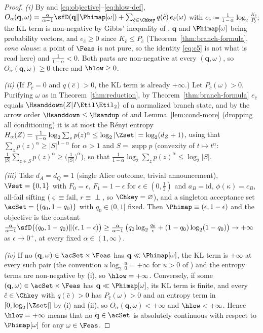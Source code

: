 \begin{proof}
\emph{(i)} By  and
\eqref{eq:objective}--\eqref{eq:hlow-def},
$O_{\alpha}(\mathbf q,\omega)
=\frac{\alpha}{\alpha-1}\sfD(\mathbf q\|\Phimap[\omega])
+\sum_{\hat c\in\Chkey}q(\hat c)\,e_{\hat c}(\omega)$ with
$e_{\hat c}\coloneqq\frac{1}{1-\alpha}\log_2\frac{K_{\hat c}}{P_{\hat c}}$;
the KL term is non-negative by Gibbs' inequality of
, $\mathbf q$ and $\Phimap[\omega]$ being
probability vectors, and $e_{\hat c}\ge0$ since
$K_{\hat c}\le P_{\hat c}$ (Theorem~\ref{thm:branch-formula}, \emph{cone
clause}: a point of $\Feas$ is not pure, so the identity \eqref{eq:c5} is not
what is read here) and $\frac{1}{1-\alpha}<0$. Both parts are non-negative at
every $(\mathbf q,\omega)$, so $O_{\alpha}(\mathbf q,\omega)\ge0$ there and
$\hlow\ge0$.

\emph{(ii)} (If $P_{\hat c}=0$ and $q(\hat c)>0$, the KL term is already
$+\infty$.) Let $P_{\hat c}(\omega)>0$. Purifying $\omega$ as in
Theorem~\ref{thm:reduction}, by Theorem~\ref{thm:branch-formula}
$e_{\hat c}$ equals $\Hsanddown(Z|I\Etil\Etil_2)$ of a normalized branch
state, and by the arrow order $\Hsanddown\le\Hsandup$ of
 and Lemma~\ref{lem:cond-more} (dropping all
conditioning) it is at most the R\'enyi entropy
$H_{\alpha}(Z)=\frac{1}{1-\alpha}\log_2\sum_zp(z)^{\alpha}
\le\log_2|\Zset|=\log_2(d_Z+1)$, using that
$\sum_zp(z)^{\alpha}\ge|S|^{1-\alpha}$ for $\alpha>1$ and
$S=\operatorname{supp}p$ (convexity of $t\mapsto t^{\alpha}$:
$\frac{1}{|S|}\sum_{z\in S}p(z)^{\alpha}
\ge\big(\frac{1}{|S|}\big)^{\alpha}$), so that
$\frac{1}{1-\alpha}\log_2\sum_zp(z)^{\alpha}\le\log_2|S|$.

\emph{(iii)} Take $d_A=d_Q=1$ (single Alice outcome, trivial
announcement), $\Vset=\{0,1\}$ with $F_0=\epsilon$, $F_1=1-\epsilon$ for
$\epsilon\in(0,\tfrac12)$ and $a_B=\mathrm{id}$, $\phi(\kappa)=c_B$,
all-fail sifting ($\varsigma\equiv\mathrm{fail}$, $r\equiv\perp$, so
$\Chkey=\varnothing$), and a singleton acceptance set
$\acSet=\{(q_0,1-q_0)\}$ with $q_0\in(0,1]$ fixed. Then
$\Phimap\equiv(\epsilon,1-\epsilon)$ and the objective is the constant
$\frac{\alpha}{\alpha-1}\sfD\big((q_0,1-q_0)\|(\epsilon,1-\epsilon)\big)
\ge\frac{\alpha}{\alpha-1}\,\big(q_0\log_2\frac{q_0}{\epsilon}
+(1-q_0)\log_2(1-q_0)\big)\to+\infty$ as $\epsilon\to0^{+}$, at every
fixed $\alpha\in(1,\infty)$.

\emph{(iv)} If no $(\mathbf q,\omega)\in\acSet\times\Feas$ has
$\mathbf q\ll\Phimap[\omega]$, the KL term is $+\infty$ at every such pair
(the convention $u\log_2\frac u0=+\infty$ for $u>0$ of
) and the entropy terms are non-negative by (i), so
$\hlow=+\infty$. Conversely, if some $(\mathbf q,\omega)\in\acSet\times\Feas$
has $\mathbf q\ll\Phimap[\omega]$, its KL term is finite, and every
$\hat c\in\Chkey$ with $q(\hat c)>0$ has $P_{\hat c}(\omega)>0$ and an
entropy term in $[0,\log_2|\Zset|]$ by (i) and (ii), so
$O_{\alpha}(\mathbf q,\omega)<+\infty$ and $\hlow<+\infty$. Hence
$\hlow=+\infty$ means that no $\mathbf q\in\acSet$ is absolutely continuous
with respect to $\Phimap[\omega]$ for any $\omega\in\Feas$.
\end{proof}
